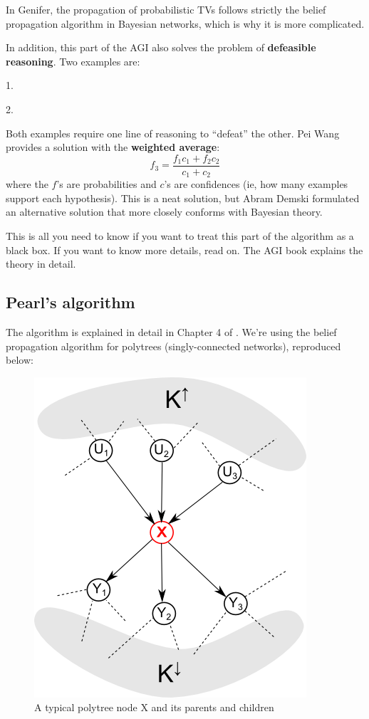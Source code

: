 In Genifer, the propagation of probabilistic TVs follows strictly the belief propagation
algorithm in Bayesian networks, which is why it is more complicated.

In addition, this part of the AGI also solves the problem of \textbf{defeasible reasoning}.
Two examples are:

1.  

2.  

Both examples require one line of reasoning to ``defeat'' the other.  Pei Wang provides a
solution with the \textbf{weighted average}:
$$ f_3 = \frac{f_1 c_1 + f_2 c_2} {c_1 + c_2} $$
where the $f$'s are probabilities and $c$'s are confidences (ie, how many examples support each
hypothesis).  This is a neat solution, but Abram Demski formulated an alternative solution that
more closely conforms with Bayesian theory.

This is all you need to know if you want to treat this part of the algorithm as a black box.
If you want to know more details, read on.  The AGI book explains the theory in detail.

\subsection{Pearl's algorithm}

The algorithm is explained in detail in Chapter 4 of \citep*{Pearl1988}.  We're using the belief
propagation algorithm for polytrees (singly-connected networks), reproduced below:
\begin{figure}[h]
\centering
\includegraphics{polytree-typical-node.png}
\caption{A typical polytree node X and its parents and children}
\label{fig:polytree-typical-node}
\end{figure}

